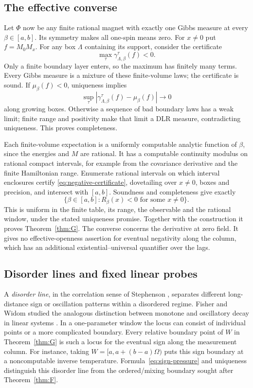 \subsection{The effective converse}\label{sec:response-converse}

Let \(\Phi\) now be any finite rational magnet with exactly one Gibbs measure at every \(\beta\in[a,b]\). Its symmetry makes all one-spin means zero. For \(x\ne0\) put \(f=M_0M_x\). For any box \(\Lambda\) containing its support, consider the certificate
\begin{equation}\label{eq:negative-certificate}
 \max_\tau\gamma_{\Lambda,\beta}^\tau(f)<0.
\end{equation}
Only a finite boundary layer enters, so the maximum has finitely many terms. Every Gibbs measure is a mixture of these finite-volume laws; the certificate is sound. If \(\mu_\beta(f)<0\), uniqueness implies
\[
 \sup_\tau|\gamma_{\Lambda,\beta}^\tau(f)-\mu_\beta(f)|\longrightarrow0
\]
along growing boxes. Otherwise a sequence of bad boundary laws has a weak limit; finite range and positivity make that limit a DLR measure, contradicting uniqueness. This proves completeness.

Each finite-volume expectation is a uniformly computable analytic function of \(\beta\), since the energies and \(M\) are rational. It has a computable continuity modulus on rational compact intervals, for example from the covariance derivative and the finite Hamiltonian range. Enumerate rational intervals on which interval enclosures certify \eqref{eq:negative-certificate}, dovetailing over \(x\ne0\), boxes and precision, and intersect with \([a,b]\). Soundness and completeness give exactly
\[
 \{\beta\in[a,b]:R_\beta(x)<0\text{ for some }x\ne0\}.
\]
This is uniform in the finite table, its range, the observable and the rational window, under the stated uniqueness promise. Together with the construction it proves Theorem~\ref{thm:G}. The converse concerns the derivative at zero field. It gives no effective-openness assertion for eventual negativity along the column, which has an additional existential--universal quantifier over the lags.

\subsection{Disorder lines and fixed linear probes}\label{sec:disorder}

A \emph{disorder line}, in the correlation sense of Stephenson \cite{stephenson}, separates different long-distance sign or oscillation patterns within a disordered regime. Fisher and Widom studied the analogous distinction between monotone and oscillatory decay in linear systems \cite{fisherWidom}. In a one-parameter window the locus can consist of individual points or a more complicated boundary. Every relative boundary point of \(W\) in Theorem~\ref{thm:G} is such a locus for the eventual sign along the measurement column. For instance, taking \(W=[a,a+(b-a)\Omega)\) puts this sign boundary at a noncomputable inverse temperature. Formula~\eqref{eq:sign-pressure} and uniqueness distinguish this disorder line from the ordered/mixing boundary sought after Theorem~\ref{thm:F}.

